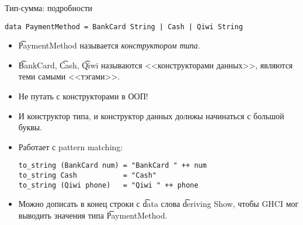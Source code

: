 \begin{frame}[fragile]{Тип-сумма: подробности}
\begin{verbatim}
data PaymentMethod = BankCard String | Cash | Qiwi String
\end{verbatim}
	\begin{itemize}
		\item \t{PaymentMethod} называется \textit{конструктором типа}.
		\item \t{BankCard}, \t{Cash}, \t{Qiwi} называются <<конструкторами данных>>, являются теми самыми <<тэгами>>.
		\item Не путать с конструкторами в ООП!
		\item И конструктор типа, и конструктор данных долнжы начинаться с большой буквы.
		\item Работает с pattern matching:
\begin{verbatim}
to_string (BankCard num) = "BankCard " ++ num
to_string Cash           = "Cash"
to_string (Qiwi phone)   = "Qiwi " ++ phone
\end{verbatim}
		\item Можно дописать в конец строки с \t{data} слова \t{deriving Show}, чтобы GHCI мог выводить значения типа \t{PaymentMethod}.
	\end{itemize}
\end{frame}
